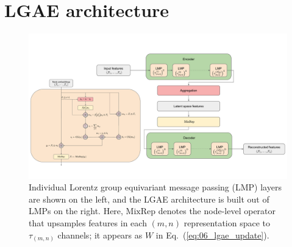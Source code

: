 



\section{LGAE architecture}
\label{sec:06_lgae_architecture}

\begin{figure}[htb!]
    \centering
    \includegraphics[width=\linewidth]{figures/06-ML4Jets/lgae/architectures/LGAE.pdf}
    \caption[Individual Lorentz group equivariant message passing (LMP) layers are shown on the left, and the LGAE architecture is built out of LMPs on the right.]{Individual Lorentz group equivariant message passing (LMP) layers are shown on the left, and the LGAE architecture is built out of LMPs on the right. 
    Here, $\mathrm{MixRep}$ denotes the node-level operator that upsamples features in each $(m, n)$ representation space to $\tau_{(m, n)}$ channels; it appears as $W$ in Eq.~(\ref{eq:06_lgae_update}).}
    \label{fig:06_lgae_architecture-full}
\end{figure}


